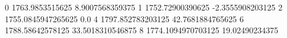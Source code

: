0 1763.9853515625 8.9007568359375
1 1752.72900390625 -2.3555908203125
2 1755.0845947265625 0.0
4 1797.852783203125 42.7681884765625
6 1788.58642578125 33.5018310546875
8 1774.1094970703125 19.02490234375
